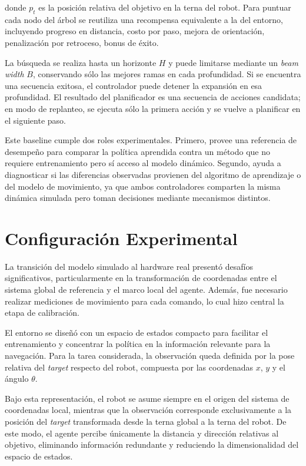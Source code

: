 \documentclass[conference]{IEEEtran}
\begin{document}
donde $p_t$ es la posición relativa del objetivo en la terna del robot. Para puntuar cada nodo del árbol se reutiliza una recompensa equivalente a la del entorno, incluyendo progreso en distancia, costo por paso, mejora de orientación, penalización por retroceso, bonus de éxito.

La búsqueda se realiza hasta un horizonte $H$ y puede limitarse mediante un \textit{beam width} $B$, conservando sólo las mejores ramas en cada profundidad. Si se encuentra una secuencia exitosa, el controlador puede detener la expansión en esa profundidad. El resultado del planificador es una secuencia de acciones candidata; en modo de replanteo, se ejecuta sólo la primera acción y se vuelve a planificar en el siguiente paso.

Este baseline cumple dos roles experimentales. Primero, provee una referencia de desempeño para comparar la política aprendida contra un método que no requiere entrenamiento pero sí acceso al modelo dinámico. Segundo, ayuda a diagnosticar si las diferencias observadas provienen del algoritmo de aprendizaje o del modelo de movimiento, ya que ambos controladores comparten la misma dinámica simulada pero toman decisiones mediante mecanismos distintos.

\section{Configuración Experimental}
La transición del modelo simulado al hardware real presentó desafíos significativos, particularmente en la transformación de coordenadas entre el sistema global de referencia y el marco local del agente. Además, fue necesario realizar mediciones de movimiento para cada comando, lo cual hizo central la etapa de calibración.

El entorno se diseñó con un espacio de estados compacto para facilitar el entrenamiento y concentrar la política en la información relevante para la navegación. Para la tarea considerada, la observación queda definida por la pose relativa del \textit{target} respecto del robot, compuesta por las coordenadas $x$, $y$ y el ángulo $\theta$.

Bajo esta representación, el robot se asume siempre en el origen del sistema de coordenadas local, mientras que la observación corresponde exclusivamente a la posición del \textit{target} transformada desde la terna global a la terna del robot. De este modo, el agente percibe únicamente la distancia y dirección relativas al objetivo, eliminando información redundante y reduciendo la dimensionalidad del espacio de estados.
\end{document}
